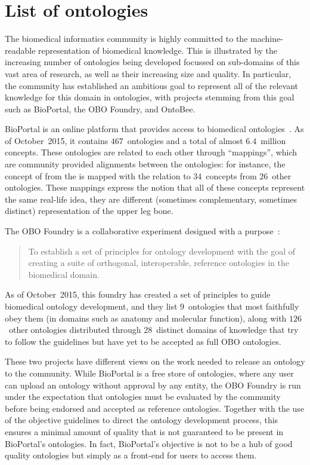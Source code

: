 \chapter{List of ontologies} \label{app:ontologies}

The biomedical informatics community is highly committed to the machine-readable representation of biomedical knowledge. This is illustrated by the increasing number of ontologies being developed focussed on sub-domains of this vast area of research, as well as their increasing size and quality. In particular, the community has established an ambitious goal to represent all of the relevant knowledge for this domain in ontologies, with projects stemming from this goal such as BioPortal, the OBO Foundry, and OntoBee.

BioPortal is an online platform that provides access to biomedical ontologies~\citep{Noy2009,Whetzel2011}. As of October~2015, it contains $467$~ontologies and a total of almost $6.4$~million concepts. These ontologies are related to each other through ``mappings'', which are community provided alignments between the ontologies: for instance, the concept of  from the  is mapped with the relation  to $34$~concepts from $26$~other ontologies. These mappings express the notion that all of these concepts represent the same real-life idea, \ie they are different (sometimes complementary, sometimes distinct) representation of the upper leg bone.

The OBO Foundry is a collaborative experiment designed with a purpose~\citep{Smith2007}:
\begin{quote}
    To establish a set of principles for ontology development with the goal of creating a suite of orthogonal, interoperable, reference ontologies in the biomedical domain.
\end{quote}
As of October~2015, this foundry has created a set of principles to guide biomedical ontology development, and they list $9$~ontologies that most faithfully obey them (in domains such as anatomy and molecular function), along with $126$~other ontologies distributed through $28$~distinct domains of knowledge that try to follow the guidelines but have yet to be accepted as full OBO ontologies.

These two projects have different views on the work needed to release an ontology to the community. While BioPortal is a free store of ontologies, where any user can upload an ontology without approval by any entity, the OBO Foundry is run under the expectation that ontologies must be evaluated by the community before being endorsed and accepted as reference ontologies. Together with the use of the objective guidelines to direct the ontology development process, this ensures a minimal amount of quality that is not guaranteed to be present in BioPortal's ontologies. In fact, BioPortal's objective is not to be a hub of good quality ontologies but simply as a front-end for users to access them.

